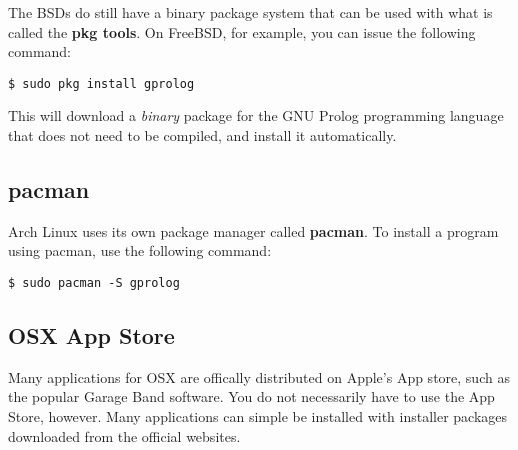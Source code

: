 The BSDs do still have a binary package system that can be used with what is called the \textbf{pkg tools}.  On FreeBSD, for example, you can issue the following command:

\begin{verbatim}
$ sudo pkg install gprolog
\end{verbatim}

This will download a \textit{binary} package for the GNU Prolog programming language that does not need to be compiled, and install it automatically.

\subsection{pacman}

Arch Linux uses its own package manager called \textbf{pacman}.  To install a program using pacman, use the following command:

\begin{verbatim}
$ sudo pacman -S gprolog
\end{verbatim}

\subsection{OSX App Store}

Many applications for OSX are offically distributed on Apple's App store, such as the popular Garage Band software.  You do not necessarily have to use the App Store, however.  Many applications can simple be installed with installer packages downloaded from the official websites.
